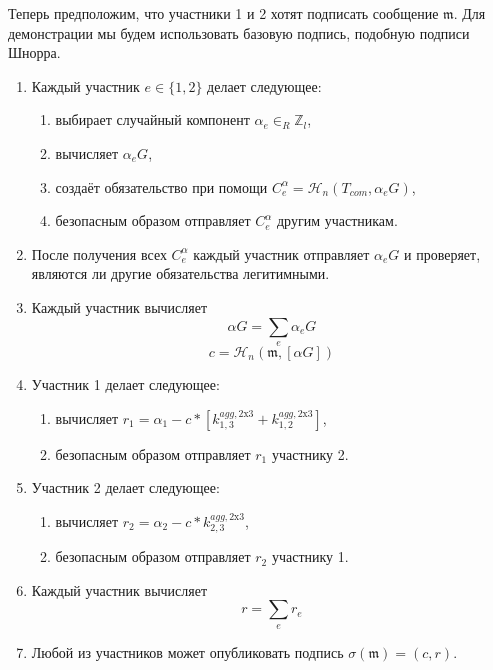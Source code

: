Теперь предположим, что участники 1 и 2 хотят подписать сообщение $\mathfrak{m}$. Для демонстрации мы будем использовать базовую подпись, подобную подписи Шнорра.
\begin{enumerate}
    \item Каждый участник $e \in \{1,2\}$ делает следующее:
    \begin{enumerate}
        \item выбирает случайный компонент $\alpha_e \in_R \mathbb{Z}_l$,
        \item вычисляет $\alpha_e G$,
        \item создаёт обязательство при помощи $C^{\alpha}_{e} = \mathcal{H}_n(T_{com},\alpha_e G)$,
        \item безопасным образом отправляет $C^{\alpha}_{e}$ другим участникам.
    \end{enumerate}
    \item После получения всех $C^{\alpha}_{e}$ каждый участник отправляет $\alpha_e G$ и проверяет, являются ли другие обязательства легитимными.
    \item Каждый участник вычисляет
    \[\alpha G = \sum_e \alpha_e G\]
    \[c = \mathcal{H}_n(\mathfrak{m},[\alpha G])\]
    \item Участник 1 делает следующее:
    \begin{enumerate}
        \item вычисляет $r_1 = \alpha_1 - c*[k^{agg,\textrm{2x3}}_{1,3} + k^{agg,\textrm{2x3}}_{1,2}]$,
        \item безопасным образом отправляет $r_1$ участнику 2.
    \end{enumerate}
    \item Участник 2 делает следующее:
    \begin{enumerate}
        \item вычисляет $r_2 = \alpha_2 - c*k^{agg,\textrm{2x3}}_{2,3}$,
        \item безопасным образом отправляет $r_2$ участнику 1.
    \end{enumerate}
    \item Каждый участник вычисляет 
    \[r = \sum_e r_e\]
    \item Любой из участников может опубликовать подпись $\sigma(\mathfrak{m}) = (c,r)$.
\end{enumerate}

